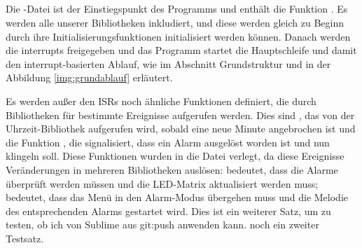 \subsection{}
Die -Datei ist der Einstiegspunkt des Programms und enthält die Funktion . Es werden alle unserer Bibliotheken inkludiert, und diese werden gleich zu Beginn durch ihre Initialisierungsfunktionen initialisiert werden können. Danach werden die interrupts freigegeben und das Programm startet die Hauptschleife und damit den interrupt-basierten Ablauf, wie im Abschnitt Grundstruktur und in der Abbildung \ref{img:grundablauf} erläutert.
\newline


Es werden außer den ISRs noch ähnliche Funktionen definiert, die durch Bibliotheken für bestimmte Ereignisse aufgerufen werden. Dies sind , das von der Uhrzeit-Bibliothek aufgerufen wird, sobald eine neue Minute angebrochen ist und die Funktion , die signalisiert, dass ein Alarm ausgelöst worden ist und nun klingeln soll. Diese Funktionen wurden in die  Datei verlegt, da diese Ereignisse Veränderungen in mehreren Bibliotheken auslösen:  bedeutet, dass die Alarme überprüft werden müssen und die LED-Matrix aktualisiert werden muss;
 bedeutet, dass das Menü in den Alarm-Modus übergehen muss und die Melodie des entsprechenden Alarms gestartet wird.
Dies ist ein weiterer Satz, um zu testen, ob ich von Sublime aus git:push anwenden kann.
noch ein zweiter Testsatz.